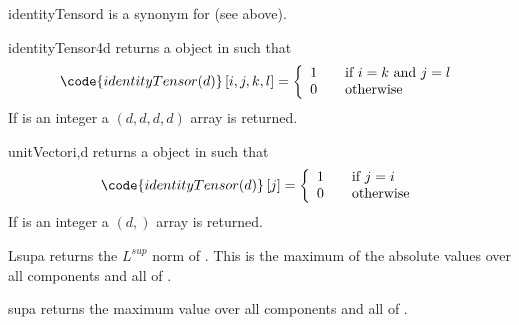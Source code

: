 \begin{funcdesc}{identityTensor}{d}
is a synonym for  (see above).
\end{funcdesc}

\begin{funcdesc}{identityTensor4}{d}
returns a \RankFour \Data object in \FunctionSpace {} such that
\begin{equation}
\code{identityTensor(d)}\left[ i,j,k,l\right] = \left\{
\begin{array}{l l}
    1 & \quad \text{if $i=k$ and $j=l$}\\
    0 & \quad \text{otherwise}
\end{array}
\right.
\end{equation}
If  is an integer a $(d,d,d,d)$ \numpy array is returned.
\end{funcdesc}

\begin{funcdesc}{unitVector}{i,d}
returns a \RankOne \Data object in \FunctionSpace {} such that
\begin{equation}
\code{identityTensor(d)}\left[ j \right] = \left\{
\begin{array}{l l}
    1 & \quad \text{if $j=i$}\\
    0 & \quad \text{otherwise}
\end{array}
\right.
\end{equation}
If  is an integer a $(d,)$ \numpy array is returned.
\end{funcdesc}

\begin{funcdesc}{Lsup}{a}
returns the $L^{sup}$ norm of . This is the maximum of the absolute
values over all components and all \DataSamplePoints of .
\end{funcdesc}

\begin{funcdesc}{sup}{a}
returns the maximum value over all components and all \DataSamplePoints of .
\end{funcdesc}

